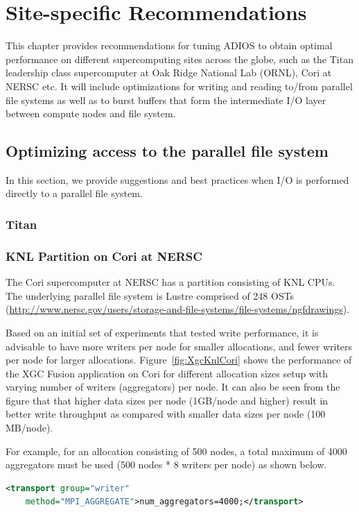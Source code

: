 \chapter{Site-specific Recommendations}
\label{site-recommendations}

This chapter provides recommendations for tuning ADIOS to obtain optimal performance on different supercomputing sites across the globe, such as the Titan leadership class supercomputer at Oak Ridge National Lab (ORNL), Cori at NERSC etc.
It will include optimizations for writing and reading to/from parallel file systems as well as to burst buffers that form the intermediate I/O layer between compute nodes and file system.


\section{Optimizing access to the parallel file system}
In this section, we provide suggestions and best practices when I/O is performed directly to a parallel file system.

\subsection{Titan}

\subsection{KNL Partition on Cori at NERSC}
The Cori supercomputer at NERSC has a partition consisting of KNL CPUs.
The underlying parallel file system is Lustre comprised of 248 OSTs (\url{http://www.nersc.gov/users/storage-and-file-systems/file-systems/ngfdrawings}).

Based on an initial set of experiments that tested write performance, it is advisable to have more writers per node for smaller allocations, and fewer writers per node for larger allocations.
Figure~\ref{fig:XgcKnlCori} shows the performance of the XGC Fusion application on Cori for different allocation sizes setup with varying number of writers (aggregators) per node.
It can also be seen from the figure that that higher data sizes per node (1GB/node and higher) result in better write throughput as compared with smaller data sizes per node (100 MB/node).

For example, for an allocation consisting of 500 nodes, a total maximum of 4000 aggregators must be used (500 nodes * 8 writers per node) as shown below. 
\begin{lstlisting}[language=XML]
<transport group="writer"
    method="MPI_AGGREGATE">num_aggregators=4000;</transport>
\end{lstlisting}

